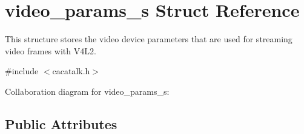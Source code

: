 \hypertarget{structvideo__params__s}{\section{video\-\_\-params\-\_\-s \-Struct \-Reference}
\label{structvideo__params__s}
}


\-This structure stores the video device parameters that are used for streaming video frames with \-V4\-L2.  




{\ttfamily \#include $<$cacatalk.\-h$>$}



\-Collaboration diagram for video\-\_\-params\-\_\-s\-:
\subsection*{\-Public \-Attributes}
